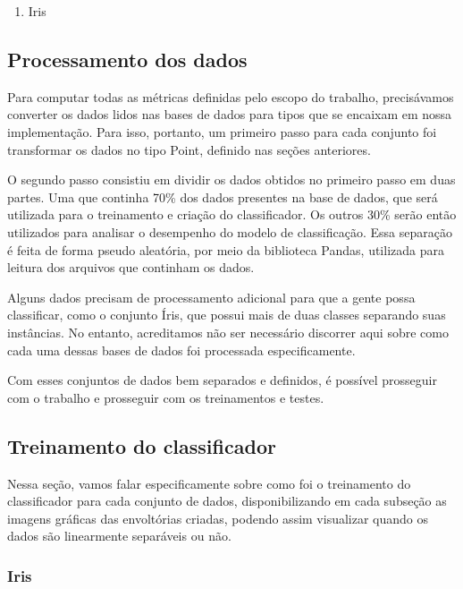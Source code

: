 \documentclass{article}
\begin{document}
\begin{enumerate}
    \item Iris
    
\end{enumerate}

\subsection{Processamento dos dados}

Para computar todas as métricas definidas pelo escopo do trabalho, precisávamos converter os dados lidos nas bases de dados para tipos que se encaixam em nossa implementação. Para isso, portanto, um primeiro passo para cada conjunto foi transformar os dados no tipo Point, definido nas seções anteriores.

O segundo passo consistiu em dividir os dados obtidos no primeiro passo em duas partes. Uma que continha 70\% dos dados presentes na base de dados, que será utilizada para o treinamento e criação do classificador. Os outros 30\% serão então utilizados para analisar o desempenho do modelo de classificação. Essa separação é feita de forma pseudo aleatória, por meio da biblioteca Pandas, utilizada para leitura dos arquivos que continham os dados. 

Alguns dados precisam de processamento adicional para que a gente possa classificar, como o conjunto Íris, que possui mais de duas classes separando suas instâncias. No entanto, acreditamos não ser necessário discorrer aqui sobre como cada uma dessas bases de dados foi processada especificamente.

Com esses conjuntos de dados bem separados e definidos, é possível prosseguir com o trabalho e prosseguir com os treinamentos e testes.

\subsection{Treinamento do classificador}

Nessa seção, vamos falar especificamente sobre como foi o treinamento do classificador para cada conjunto de dados, disponibilizando em cada subseção as imagens gráficas das envoltórias criadas, podendo assim visualizar quando os dados são linearmente separáveis ou não.

\subsubsection{Iris}
\end{document}

